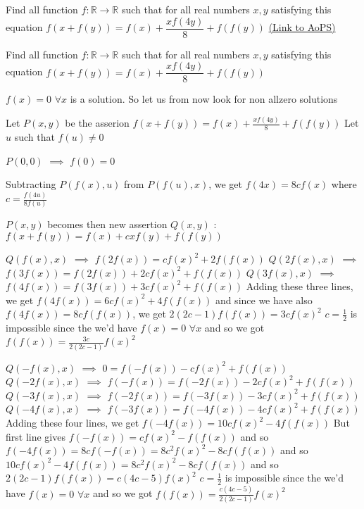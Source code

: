 \begin{problem}
	Find all function $f:\mathbb{R}\rightarrow\mathbb{R}$ such that for all real numbers $x,y$ satisfying this equation
$f(x+f(y))=f(x)+\dfrac{xf(4y)}{8}+f(f(y))$
	\flushright \href{https://artofproblemsolving.com/community/c6h472223}{(Link to AoPS)}
\end{problem}



\begin{solution}
	\begin{tcolorbox}Find all function $f:\mathbb{R}\rightarrow\mathbb{R}$ such that for all real numbers $x,y$ satisfying this equation
$f(x+f(y))=f(x)+\dfrac{xf(4y)}{8}+f(f(y))$\end{tcolorbox}
$f(x)=0$ $\forall x$ is a solution. So let us from now look for non allzero solutions

Let $P(x,y)$ be the asserion $f(x+f(y))=f(x)+\frac{xf(4y)}8+f(f(y))$
Let $u$ such that $f(u)\ne 0$

$P(0,0)$ $\implies$ $f(0)=0$

Subtracting $P(f(x),u)$ from $P(f(u),x)$, we get $f(4x)=8cf(x)$ where $c=\frac{f(4u)}{8f(u)}$

$P(x,y)$ becomes then new assertion $Q(x,y)$ : $f(x+f(y))=f(x)+cxf(y)+f(f(y))$

$Q(f(x),x)$ $\implies$ $f(2f(x))=cf(x)^2+2f(f(x))$
$Q(2f(x),x)$ $\implies$ $f(3f(x))=f(2f(x))+2cf(x)^2+f(f(x))$
$Q(3f(x),x)$ $\implies$ $f(4f(x))=f(3f(x))+3cf(x)^2+f(f(x))$
Adding these three lines, we get $f(4f(x))=6cf(x)^2+4f(f(x))$ and since we have also $f(4f(x))=8cf(f(x))$, we get $2(2c-1)f(f(x))=3cf(x)^2$
$c=\frac 12$ is impossible since the we'd have $f(x)=0$ $\forall x$ and so we got $\boxed{f(f(x))=\frac{3c}{2(2c-1)}f(x)^2}$

$Q(-f(x),x)$ $\implies$ $0=f(-f(x))-cf(x)^2+f(f(x))$
$Q(-2f(x),x)$ $\implies$ $f(-f(x))=f(-2f(x))-2cf(x)^2+f(f(x))$
$Q(-3f(x),x)$ $\implies$ $f(-2f(x))=f(-3f(x))-3cf(x)^2+f(f(x))$
$Q(-4f(x),x)$ $\implies$ $f(-3f(x))=f(-4f(x))-4cf(x)^2+f(f(x))$
Adding these four lines, we get $f(-4f(x))=10cf(x)^2-4f(f(x))$
But first line gives $f(-f(x))=cf(x)^2-f(f(x))$ and so $f(-4f(x))=8cf(-f(x))=8c^2f(x)^2-8cf(f(x))$ and so $10cf(x)^2-4f(f(x))=8c^2f(x)^2-8cf(f(x))$ and so $2(2c-1)f(f(x))=c(4c-5)f(x)^2$
$c=\frac 12$ is impossible since the we'd have $f(x)=0$ $\forall x$ and so we got $\boxed{f(f(x))=\frac{c(4c-5)}{2(2c-1)}f(x)^2}$


\end{solution}
